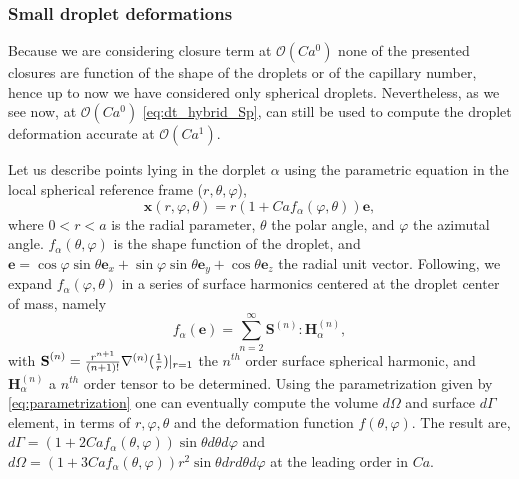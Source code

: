 \subsubsection{Small droplet deformations}

Because we are considering closure term at $\mathcal{O}(Ca^0)$ none of the presented closures are function of the shape of the droplets or of the capillary number, hence up to now we have considered only spherical droplets. 
Nevertheless, as we  see now, at $\mathcal{O}(Ca^0)$ \ref{eq:dt_hybrid_Sp}, can still be used to compute the droplet deformation accurate at $\mathcal{O}(Ca^1)$. 

Let us describe points lying in the dorplet $\alpha$ using the parametric equation in the local spherical reference frame ($r,\theta,\varphi$),
\begin{equation}
    \textbf{x}(r,\varphi,\theta) = r (1+ Ca f_\alpha(\varphi,\theta)) \textbf{e},
    \label{eq:parametrization}
\end{equation}
where $0<r<a$ is the radial parameter, $\theta$ the polar angle, and $\varphi$ the azimutal angle. 
$f_\alpha(\theta,\varphi)$ is the shape function of the droplet, and $\textbf{e} = \cos\varphi\sin\theta \textbf{e}_x + \sin\varphi\sin\theta\textbf{e}_y+ \cos\theta \textbf{e}_z$ the radial unit vector. 
Following, \citet{nadim1996concise,nadim1991motion} we expand $f_\alpha(\varphi,\theta)$ in a series of surface harmonics centered at the droplet center of mass, namely 
\begin{equation}
    f_\alpha(\textbf{e}) = 
    \sum_{n=2}^\infty\textbf{S}^{(n)}:\textbf{H}_\alpha^{(n)},
\end{equation} 
with $\textbf{S}^{(n)} = \frac{r^{n+1}}{(n+1)!}\mathbf{\nabla}^{(n)}(\frac{1}{r})|_{r=1}$ the $n^{th}$ order surface spherical harmonic, and $\textbf{H}_\alpha^{(n)}$ a $n^{th}$ order tensor to be determined\citep{nadim1991motion}. 
Using the parametrization given by \ref{eq:parametrization} one can eventually compute the volume $d\Omega$ and surface $d\Gamma$ element, in terms of $r,\varphi,\theta$ and the deformation function $f(\theta,\varphi)$.
The result are, $d\Gamma = (1+2Ca f_\alpha(\theta,\varphi)) \sin\theta d\theta d\varphi$ and $d\Omega = (1+3Ca f_\alpha(\theta,\varphi)) r^2\sin\theta drd\theta d\varphi$ at the leading order in $Ca$. 
